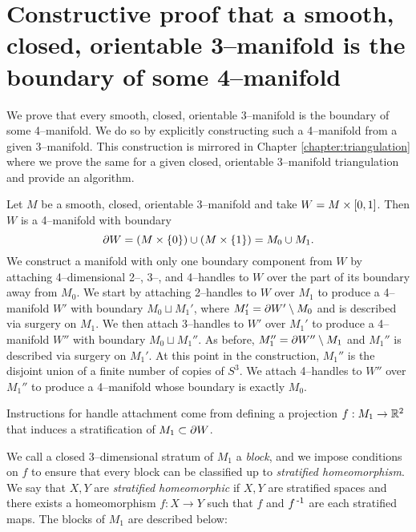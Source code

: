 \chapter[Smooth]{Constructive proof that a smooth, closed, orientable 3--manifold is the boundary of some 4--manifold}
\label{chapter:smooth}

We prove that every smooth, closed, orientable 3--manifold is the boundary of some 4--manifold.
We do so by explicitly constructing such a 4--manifold from a given 3--manifold.
This construction is mirrored in Chapter \ref{chapter:triangulation} where we prove the same for a given closed, orientable 3--manifold triangulation and provide an algorithm.

Let $M$ be a smooth, closed, orientable 3--manifold and take $W=M\times [0,1]$.
Then $W$ is a 4--manifold with boundary
\[
	\partial W = (M\times\{0\}) \cup (M\times\{1\}) = M_0 \cup M_1.
\]
We construct a manifold with only one boundary component from $W$ by attaching 4--dimensional 2--, 3--, and 4--handles to $W$ over the part of its boundary away from $M_0$.
We start by attaching 2--handles to $W$ over $M_1$ to produce a 4--manifold $W'$ with boundary $M_0 \sqcup M_1'$, where $M_1'=\partial W'\setminus M_0$ and is described via surgery on $M_1$.
We then attach 3--handles to $W'$ over $M_1'$ to produce a 4--manifold $W''$ with boundary $M_0\sqcup M_1''$.
As before, $M_1''=\partial W''\setminus M_1$ and $M_1''$ is described via surgery on $M_1'$.
At this point in the construction, $M_1''$ is the disjoint union of a finite number of copies of $S^3$.
We attach 4--handles to $W''$ over $M_1''$ to produce a 4--manifold whose boundary is exactly $M_0$.

Instructions for handle attachment come from defining a projection $f:M_1\to \mathbb{R}^2$ that induces a stratification of $M_1\subset\partial W$.

%
%
We call a closed 3--dimensional stratum of $M_1$ a \emph{block}, and we impose conditions on $f$ to ensure that every block can be classified up to \emph{stratified homeomorphism}.
We say that $X,Y$ are \emph{stratified homeomorphic} if $X,Y$ are stratified spaces and there exists a homeomorphism $f:X\to Y$ such that $f$ and $f^{\,\text{-}1}$ are each stratified maps.
The blocks of $M_1$ are described below:

